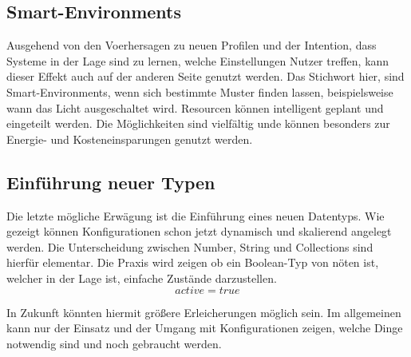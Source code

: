 \subsection{Smart-Environments}
Ausgehend von den Voerhersagen zu neuen Profilen und der Intention, dass Systeme in der Lage sind zu lernen, welche Einstellungen Nutzer treffen, kann dieser Effekt auch auf der anderen Seite genutzt werden. Das Stichwort hier, sind Smart-Environments, wenn sich bestimmte Muster finden lassen, beispielsweise wann das Licht ausgeschaltet wird. Resourcen können intelligent geplant und eingeteilt werden. Die Möglichkeiten sind vielfältig unde können besonders zur Energie- und Kosteneinsparungen genutzt werden.

\subsection{Einführung neuer Typen}
Die letzte mögliche Erwägung ist die Einführung eines neuen Datentyps. Wie gezeigt können Konfigurationen schon jetzt dynamisch und skalierend angelegt werden. Die Unterscheidung zwischen Number, String und Collections sind hierfür elementar. Die Praxis wird zeigen ob ein Boolean-Typ von nöten ist, welcher in der Lage ist, einfache Zustände darzustellen.
\begin{equation}
	active = true
\end{equation} 

In Zukunft könnten hiermit größere Erleicherungen möglich sein. Im allgemeinen kann nur der Einsatz und der Umgang mit Konfigurationen zeigen, welche Dinge notwendig sind und noch gebraucht werden. 



